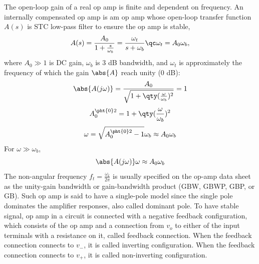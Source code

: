 \documentclass[a4paper,12pt]{report}
\begin{document}
The open-loop gain of a real op amp is finite and dependent on frequency.
An internally compensated op amp is am op amp whose open-loop transfer function $A(s)$ is STC low-pass filter to ensure the op amp is stable,
\[A(s)=\frac{A_0}{1+\frac{s}{\omega_b}}=\frac{\omega_t}{s+\omega_b}\qc\omega_t=A_0\omega_b,\]
where $A_0\gg 1$ is DC gain, $\omega_b$ is 3 dB bandwidth, and $\omega_t$ is approximately the frequency of which the gain $\abs{A}$ reach unity (0 dB):
\[\abs{A(j\omega)}=\frac{A_0}{\sqrt{1+\qty(\frac{\omega}{\omega_b})^2}}=1\]
\[A_0^{\pht{0}2}=1+\qty(\frac{\omega}{\omega_b})^2\]
\[\omega=\sqrt{A_0^{\pht{0}2}-1}\omega_b\approx A_0\omega_b\]
For $\omega\gg\omega_b$,
\[\abs{A(j\omega)}\omega\approx A_0\omega_b\]
The non-angular frequency $f_t=\frac{\omega_t}{2\pi}$ is usually specified on the op-amp data sheet as the unity-gain bandwidth or gain-bandwidth product (GBW, GBWP, GBP, or GB). Such op amp is said to have a single-pole model since the single pole dominates the amplifier responses, also called dominant pole.
To have stable signal, op amp in a circuit is connected with a negative feedback configuration, which consists of the op amp and a connection from $v_o$ to either of the input terminals with a resistance on it, called feedback connection. When the feedback connection connects to $v_-$, it is called inverting configuration. When the feedback connection connects to $v_+$, it is called non-inverting configuration.
\end{document}
